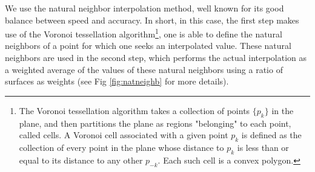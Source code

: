 We use the natural neighbor interpolation method, well known for its good balance between speed and accuracy. In short, in this case, the first step makes use of the Voronoi tessellation algorithm\footnote{The Voronoi tessellation algorithm takes a collection of points $\{p_k\}$ in the plane, and then partitions the plane as regions "belonging" to each point, called cells. A Voronoi cell associated with a given point $p_k$ is defined as the collection of every point in the plane whose distance to $p_k$ is less than or equal to its distance to any other $p_{-k}$. Each such cell is a convex polygon.}, one is able to define the natural neighbors of a point for which one seeks an interpolated value. These natural neighbors are used in the second step, which performs the actual interpolation as a weighted average of the values of these natural neighbors using a ratio of surfaces as weights (see Fig \ref{fig:natneighb} for more details).

